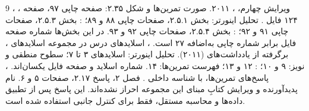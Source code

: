 \documentclass[12pt,a4paper]{article}
\newcommand{\exnum}[1]{\mbox{\beginL#1\endL}}
\begin{document}
\MakeAssignmentCover



\clearpage
\begin{thebibliography}{9}
،
،
ویرایش چهارم، ، ۲۰۱۱.
صورت تمرین‌ها و شکل \exnum{۲.۳۵}: صفحه چاپی ۹۷، صفحه ۱۲۴ فایل .
تحلیل اینورتر: بخش \exnum{۲.۵.۱}، صفحات چاپی ۸۸ و ۸۹؛
: بخش \exnum{۲.۵.۳}، صفحات چاپی ۹۱ و ۹۲؛
: بخش \exnum{۲.۵.۴}، صفحات چاپی ۹۲ و ۹۳.
در این بخش‌ها شماره صفحه فایل برابر شماره چاپی به‌اضافه ۲۷ است.
، اسلایدهای درس در مجموعه اسلایدهای
، برگرفته از یادداشت‌های
 (۲۰۱۱).
تحلیل اینورتر: اسلایدهای ۳ تا ۷؛ سطوح منطقی و نویز: ۹ و ۱۰؛
: ۱۲ و ۱۳؛ فهرست تمرین‌ها: ۱۴.
شماره اسلاید و صفحه فایل یکسان‌اند.
، پاسخ‌های تمرین‌ها، با شناسه داخلی .
فصل ۲، پاسخ \exnum{۲.۱۷}، صفحات ۵ و ۶.
نام پدیدآورنده و ویرایش کتابِ مبنای این مجموعه احراز نشده‌اند.
این پاسخ پس از تطبیق داده‌ها و محاسبه مستقل، فقط برای کنترل جانبی استفاده شده است.
\end{thebibliography}
\end{document}
